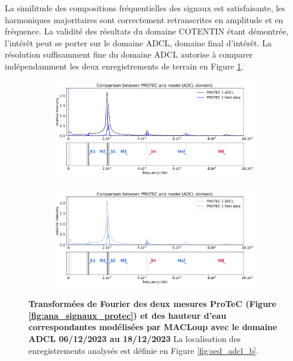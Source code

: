 \documentclass[10pt,a4paper,titlepage]{article}
\begin{document}
La similitude des compositions fréquentielles des signaux est satisfaisante, les harmoniques majoritaires sont correctement retranscrites en amplitude et en fréquence.
La validité des résultats du domaine COTENTIN étant démontrée, l'intérêt peut se porter sur le domaine ADCL, domaine final d'intérêt.
La résolution suffisamment fine du domaine ADCL autorise à comparer indépendamment les deux enregistrements de terrain en Figure \ref{fig:ana_comp_protec_ADCL}.

\begin{figure}[h!]
	\centering
	\begin{subfigure}{1.\linewidth}
		\centering
		\includegraphics[scale=0.4]{../images/post_traitement/ADCL_5_analyse_PROTEC1_field.pdf}
		\caption{}
	\end{subfigure}
	\begin{subfigure}{1.\linewidth}
		\centering
		\includegraphics[scale=0.4]{../images/post_traitement/ADCL_5_analyse_PROTEC2_field.pdf}
		\caption{}
	\end{subfigure}
	\caption{
		\textbf{Transformées de Fourier des deux mesures ProTeC (Figure \ref{fig:ana_signaux_protec}) et des hauteur d'eau correspondantes modélisées par MACLoup avec le domaine ADCL 06/12/2023 au 18/12/2023}
		La localisation des enregistrements analysés est définie en Figure \ref{fig:sed_adcl_b}.
	}
	\label{fig:ana_comp_protec_ADCL}
\end{figure}
\end{document}
